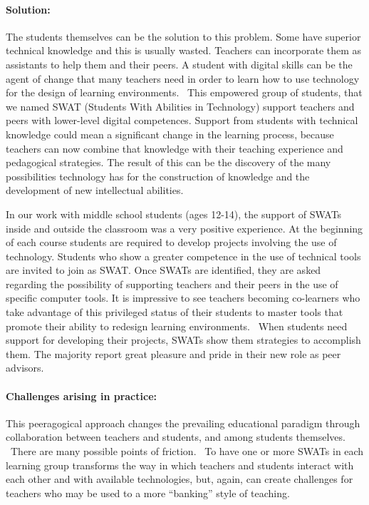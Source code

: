 \paragraph{Solution:}\label{solution}

The students themselves can be the solution to this problem. Some have
superior technical knowledge and this is usually wasted. Teachers can
incorporate them as assistants to help them and their peers. A student
with digital skills can be the agent of change that many teachers need
in order to learn how to use technology for the design of learning
environments. ~This empowered group of students, that we named SWAT
(Students With Abilities in Technology) support teachers and peers with
lower-level digital competences. Support from students with technical
knowledge could mean a significant change in the learning process,
because teachers can now combine that knowledge with their teaching
experience and pedagogical strategies. The result of this can be the
discovery of the many possibilities technology has for the construction
of knowledge and the development of new intellectual abilities.

In our work with middle school students (ages 12-14), the support of
SWATs inside and outside the classroom was a very positive experience.
At the beginning of each course students are required to develop
projects involving the use of technology. Students who show a greater
competence in the use of technical tools are invited to join as SWAT.
Once SWATs are identified, they are asked regarding the possibility of
supporting teachers and their peers in the use of specific computer
tools. It is impressive to see teachers becoming co-learners who take
advantage of this privileged status of their students to master tools
that promote their ability to redesign learning environments. ~When
students need support for developing their projects, SWATs show them
strategies to accomplish them. The majority report great pleasure and
pride in their new role as peer advisors.

\paragraph{Challenges arising in
practice:}\label{challenges-arising-in-practice}

This peeragogical approach changes the prevailing educational paradigm
through collaboration between teachers and students, and among students
themselves. ~There are many possible points of friction. ~To have one or
more SWATs in each learning group transforms the way in which teachers
and students interact with each other and with available technologies,
but, again, can create challenges for teachers who may be used to a more
``banking'' style of teaching.

